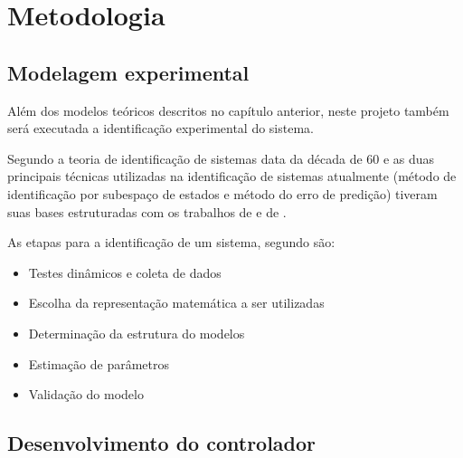 \chapter{Metodologia}
\label{ch:metodologia}


\section{Modelagem experimental}
\label{sec:modelagem_experimental}

Além dos modelos teóricos descritos no capítulo anterior, neste projeto também será executada a identificação
experimental do sistema.

Segundo  a teoria de identificação de sistemas data da década de 60 e as duas
principais técnicas utilizadas na identificação de sistemas atualmente (método de identificação por
subespaço de estados e método do erro de predição) tiveram suas bases estruturadas com os trabalhos
de  e de .

As etapas para a identificação de um sistema, segundo  são:
\begin{itemize}
    \item Testes dinâmicos e coleta de dados
    \item Escolha da representação matemática a ser utilizadas
    \item Determinação da estrutura do modelos
    \item Estimação de parâmetros
    \item Validação do modelo
\end{itemize}

\section{Desenvolvimento do controlador}
\label{sec:desenvolvimento_do_controlador}

